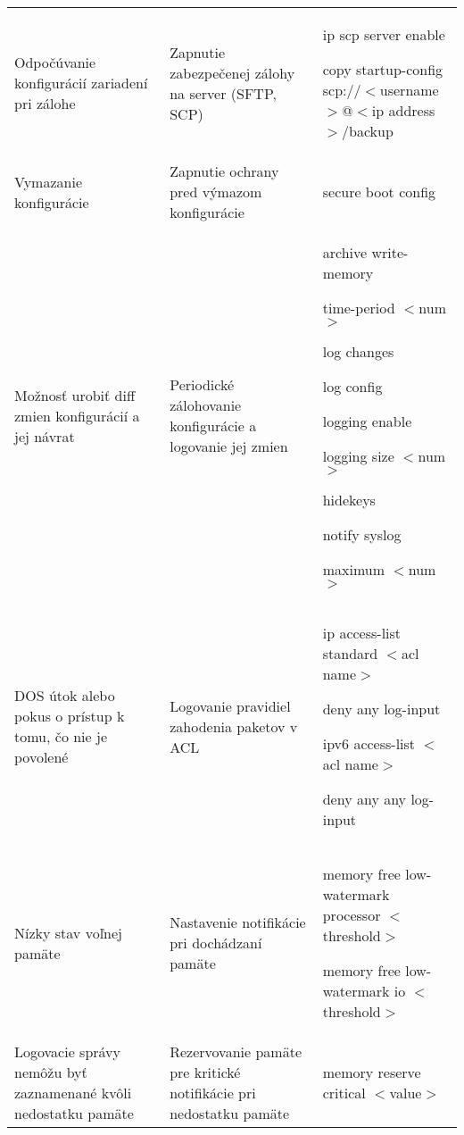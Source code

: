 \begin{longtable}[!htbp]{|L{10em}L{10em}>{\selectfont}L{34em}|}
	
	
	
	
	Odpočúvanie konfigurácií zariadení pri zálohe	&Zapnutie zabezpečenej zálohy na server (SFTP, SCP)	&ip scp server enable
	
	copy startup-config scp://$<$username$>$@$<$ip address$>$/backup\\
	
	
	
	
	Vymazanie konfigurácie	&Zapnutie ochrany pred výmazom konfigurácie	&secure boot config\\
	
	
	
	Možnosť urobiť diff zmien konfigurácií a jej návrat	&Periodické zálohovanie konfigurácie a logovanie jej zmien	&archive
	write-memory
	
	time-period $<$num$>$
	
	log changes
	
	log config
	
	logging enable
	
	logging size $<$num$>$
	
	
	hidekeys
	
	notify syslog
	
	maximum $<$num$>$\\
	
	
	
	
	 DOS útok alebo pokus o prístup k tomu, čo nie je povolené	&Logovanie pravidiel zahodenia paketov v ACL	&ip access-list standard $<$acl name$>$
	
	\hspace{0.5em}deny any log-input
	
	ipv6 access-list $<$acl name$>$
	
	\hspace{0.5em}deny any any log-input\\
	
	
	
	
	Nízky stav voľnej pamäte	&Nastavenie notifikácie pri dochádzaní pamäte	&memory free low-watermark processor $<$threshold$>$
	
	memory free low-watermark io $<$threshold$>$\\
	
	
	
	
	Logovacie správy nemôžu byť zaznamenané kvôli nedostatku pamäte	&Rezervovanie pamäte pre kritické notifikácie pri nedostatku pamäte	&memory reserve critical $<$value$>$ \\
	

\end{longtable}
